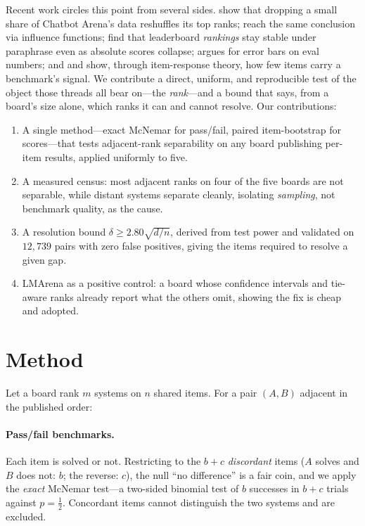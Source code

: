 \documentclass{article}
\begin{document}
Recent work circles this point from several sides. \citet{singh2025} show that dropping a small share
of Chatbot Arena's data reshuffles its top ranks; \citet{huang2025} reach the same conclusion via
influence functions; \citet{mizzaro2025} find that leaderboard \emph{rankings} stay stable under
paraphrase even as absolute scores collapse; \citet{miller2024} argues for error bars on eval
numbers; and \citet{polo2024} and \citet{kipnis2024} show, through item-response theory, how few items
carry a benchmark's signal. We contribute a direct, uniform, and reproducible test of the object those
threads all bear on---the \emph{rank}---and a bound that says, from a board's size alone, which ranks
it can and cannot resolve. Our contributions:
\begin{enumerate}\itemsep1pt
  \item A single method---exact McNemar for pass/fail, paired item-bootstrap for scores---that tests
  adjacent-rank separability on any board publishing per-item results, applied uniformly to five.
  \item A measured census: most adjacent ranks on four of the five boards are not separable, while
  distant systems separate cleanly, isolating \emph{sampling}, not benchmark quality, as the cause.
  \item A resolution bound $\delta \ge 2.80\sqrt{d/n}$, derived from test power and validated on
  $12{,}739$ pairs with zero false positives, giving the items required to resolve a given gap.
  \item LMArena as a positive control: a board whose confidence intervals and tie-aware ranks already
  report what the others omit, showing the fix is cheap and adopted.
\end{enumerate}

\section{Method}
\label{sec:method}
Let a board rank $m$ systems on $n$ shared items. For a pair $(A,B)$ adjacent in the published order:

\paragraph{Pass/fail benchmarks.} Each item is solved or not. Restricting to the $b+c$ \emph{discordant}
items ($A$ solves and $B$ does not: $b$; the reverse: $c$), the null ``no difference'' is a fair coin,
and we apply the \emph{exact} McNemar test---a two-sided binomial test of $b$ successes in $b+c$ trials
against $p=\tfrac12$. Concordant items cannot distinguish the two systems and are excluded.
\end{document}
